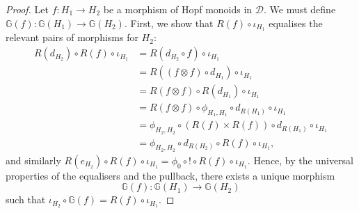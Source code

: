 \documentclass{amsart}
\begin{document}
\begin{proof}
Let $f \colon H_1 \longrightarrow H_2$ be a morphism of Hopf monoids in $\mathcal{D}$. We must define $\mathbb{G}(f) \colon \mathbb{G}(H_1) \longrightarrow \mathbb{G}(H_2)$. First, we show that $R(f) \circ \iota_{H_1}$ equalises the relevant pairs of morphisms for $H_2$:
\begin{align*}
R(d_{H_2}) \circ R(f) \circ \iota_{H_1}
&= R(d_{H_2} \circ f) \circ \iota_{H_1} \\
&= R((f \otimes f) \circ d_{H_1}) \circ \iota_{H_1} \\
&= R(f \otimes f) \circ R(d_{H_1}) \circ \iota_{H_1} \\
&= R(f \otimes f) \circ \phi_{H_1,H_1} \circ d_{R(H_1)} \circ \iota_{H_1} \\
&= \phi_{H_2,H_2} \circ (R(f) \times R(f)) \circ d_{R(H_1)} \circ \iota_{H_1} \\
&= \phi_{H_2,H_2} \circ d_{R(H_2)} \circ R(f) \circ \iota_{H_1},
\end{align*}
and similarly $R(e_{H_2}) \circ R(f) \circ \iota_{H_1} = \phi_0 \circ ! \circ R(f) \circ \iota_{H_1}$. Hence, by the universal properties of the equalisers and the pullback, there exists a unique morphism
\[
\mathbb{G}(f) \colon \mathbb{G}(H_1) \longrightarrow \mathbb{G}(H_2)
\]
such that $\iota_{H_2} \circ \mathbb{G}(f) = R(f) \circ \iota_{H_1}$.


\end{proof}
\end{document}
